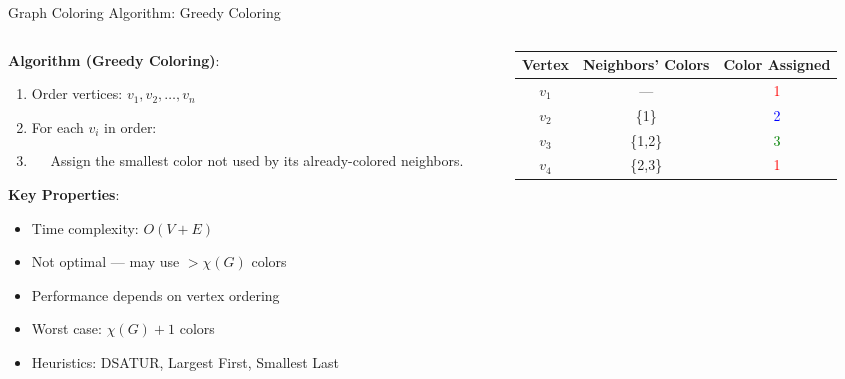 \documentclass{beamer}
\begin{document}
\begin{frame}{Graph Coloring Algorithm: Greedy Coloring}
\small

\begin{columns}

\begin{column}{0.55\textwidth}
\textbf{Algorithm (Greedy Coloring)}:
\begin{enumerate}
    \item Order vertices: $v_1, v_2, \dots, v_n$
    \item For each $v_i$ in order:
    \item[] $\quad$ Assign the smallest color not used by its already-colored neighbors.
\end{enumerate}

\textbf{Key Properties}:
\footnotesize
\begin{itemize}
\item Time complexity: $O(V + E)$
    \item Not optimal — may use $> \chi(G)$ colors
    \item Performance depends on vertex ordering
    \item Worst case: $\chi(G) + 1$ colors %
    \item Heuristics: DSATUR, Largest First, Smallest Last
\end{itemize}
\end{column}

\begin{column}{0.5\textwidth}
\begin{center}
\footnotesize
\begin{tabular}{c|c|c}
Vertex & Neighbors' Colors & Color Assigned \\
\hline
$v_1$ & — & \textcolor{red}{1} \\
$v_2$ & \{1\} & \textcolor{blue}{2} \\
$v_3$ & \{1,2\} & \textcolor{green}{3} \\
$v_4$ & \{2,3\} & \textcolor{red}{1} \\
\end{tabular}
\end{center}

\end{column}

\end{columns}

\end{frame}
\end{document}
